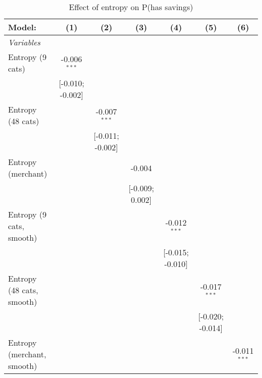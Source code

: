 
\begin{table}[htbp]
   \centering
   \tiny
   \begin{threeparttable}[b]
      \caption{\label{tab:reg_has_inflows_cnz} Effect of entropy on P(has savings)}
      \begin{tabular}{lcccccc}
         \tabularnewline \midrule \midrule
         Model:                     & (1)              & (2)              & (3)             & (4)              & (5)              & (6)\\  
         \midrule
         \emph{Variables}\\
         Entropy (9 cats)           & -0.006$^{***}$   &                  &                 &                  &                  &   \\   
                                    & [-0.010; -0.002] &                  &                 &                  &                  &   \\   
         Entropy (48 cats)          &                  & -0.007$^{***}$   &                 &                  &                  &   \\   
                                    &                  & [-0.011; -0.002] &                 &                  &                  &   \\   
         Entropy (merchant)         &                  &                  & -0.004          &                  &                  &   \\   
                                    &                  &                  & [-0.009; 0.002] &                  &                  &   \\   
         Entropy (9 cats, smooth)   &                  &                  &                 & -0.012$^{***}$   &                  &   \\   
                                    &                  &                  &                 & [-0.015; -0.010] &                  &   \\   
         Entropy (48 cats, smooth)  &                  &                  &                 &                  & -0.017$^{***}$   &   \\   
                                    &                  &                  &                 &                  & [-0.020; -0.014] &   \\   
         Entropy (merchant, smooth) &                  &                  &                 &                  &                  & -0.011$^{***}$\\   

\end{tabular}
\end{threeparttable}
\end{table}
